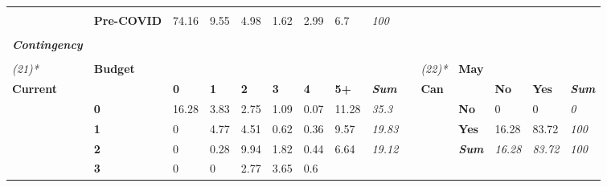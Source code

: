 {\begin{center}
\begin{longtable}{lllllllllllllll}
   &
   &
   &
   &
  \textit{} \\
 &
  \textbf{Pre-COVID} &
  \cellcolor[HTML]{A6A6A6}74.16 &
  \cellcolor[HTML]{F6F6F6}9.55 &
  \cellcolor[HTML]{FBFBFB}4.98 &
  \cellcolor[HTML]{FFFFFF}1.62 &
  \cellcolor[HTML]{FEFEFE}2.99 &
  \cellcolor[HTML]{F9F9F9}6.7 &
  \textit{100} &
   &
   &
   &
   &
   &
  \textit{} \\
 &
  \textbf{} &
   &
   &
   &
   &
   &
   &
  \textit{} &
   &
   &
   &
   &
   &
  \textit{} \\
\textit{\textbf{Contingency}} &
   &
   &
   &
   &
   &
   &
   &
  \textit{} &
   &
   &
   &
   &
   &
  \textit{} \\
 &
  \textbf{} &
   &
   &
   &
   &
   &
   &
  \textit{} &
   &
   &
   &
   &
   &
  \textit{} \\
\textit{(21)*} &
  \textbf{Budget} &
   &
   &
   &
   &
   &
   &
  \textit{} &
   &
  \textit{(22)*} &
  \textbf{May} &
   &
   &
  \textit{} \\
\textbf{Current} &
   &
  \textbf{0} &
  \textbf{1} &
  \textbf{2} &
  \textbf{3} &
  \textbf{4} &
  \textbf{5+} &
  \textit{\textbf{Sum}} &
  \textbf{} &
  \textbf{Can} &
   &
  \textbf{No} &
  \textbf{Yes} &
  \textit{\textbf{Sum}} \\
 &
  \textbf{0} &
  \cellcolor[HTML]{A6A6A6}16.28 &
  \cellcolor[HTML]{EBEBEB}3.83 &
  \cellcolor[HTML]{F0F0F0}2.75 &
  \cellcolor[HTML]{FAFAFA}1.09 &
  \cellcolor[HTML]{FFFFFF}0.07 &
  \cellcolor[HTML]{C2C2C2}11.28 &
  \textit{35.3} &
   &
   &
  \textbf{No} &
  \cellcolor[HTML]{FFFFFF}0 &
  \cellcolor[HTML]{FFFFFF}0 &
  \textit{0} \\
 &
  \textbf{1} &
  \cellcolor[HTML]{FFFFFF}0 &
  \cellcolor[HTML]{E5E5E5}4.77 &
  \cellcolor[HTML]{E7E7E7}4.51 &
  \cellcolor[HTML]{FCFCFC}0.62 &
  \cellcolor[HTML]{FEFEFE}0.36 &
  \cellcolor[HTML]{CBCBCB}9.57 &
  \textit{19.83} &
   &
   &
  \textbf{Yes} &
  \cellcolor[HTML]{EEEEEE}16.28 &
  \cellcolor[HTML]{A6A6A6}83.72 &
  \textit{100} \\
 &
  \textbf{2} &
  \cellcolor[HTML]{FFFFFF}0 &
  \cellcolor[HTML]{FEFEFE}0.28 &
  \cellcolor[HTML]{C9C9C9}9.94 &
  \cellcolor[HTML]{F6F6F6}1.82 &
  \cellcolor[HTML]{FDFDFD}0.44 &
  \cellcolor[HTML]{DBDBDB}6.64 &
  \textit{19.12} &
   &
   &
  \textit{\textbf{Sum}} &
  \textit{16.28} &
  \textit{83.72} &
  \textit{100} \\
 &
  \textbf{3} &
  \cellcolor[HTML]{FFFFFF}0 &
  \cellcolor[HTML]{FFFFFF}0 &
  \cellcolor[HTML]{F0F0F0}2.77 &
  \cellcolor[HTML]{ECECEC}3.65 &
  \cellcolor[HTML]{FCFCFC}0.6 &

\end{longtable}
\end{center}}
